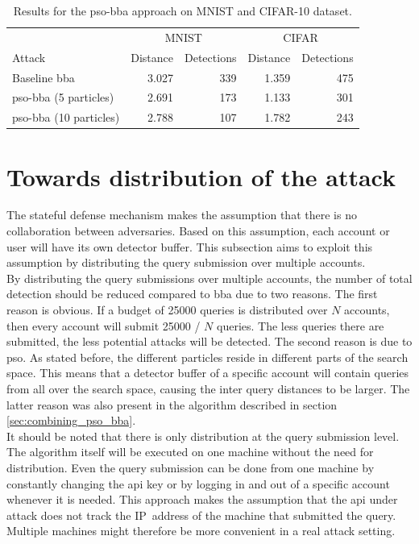 \begin{table}
	\centering
	\caption[PSO-BBA results]{Results for the \gls{pso}-\gls{bba} approach on MNIST and CIFAR-10 dataset.}
	\label{tbl:pso_bba}
	\begin{tabular}{lrrrr}\toprule
			& \multicolumn{2}{c}{MNIST} &\multicolumn{2}{c}{CIFAR} \\ \cmidrule(r){2-3} \cmidrule(r){4-5}
	Attack				&Distance	&Detections	&Distance	&Detections \\ \midrule
	Baseline \gls{bba}	&3.027		&339		&1.359			&475 \\
	\gls{pso}-\gls{bba} (5 particles)	&2.691			&173			&1.133				&301 \\ 
	\gls{pso}-\gls{bba} (10 particles)	&2.788			&107			&1.782				&243 \\
	
	\bottomrule
	
	\end{tabular}
\end{table}

\section{Towards distribution of the attack}
The stateful defense mechanism \cite{chen_stateful_2019} makes the assumption that there is no collaboration between adversaries. Based on this assumption, each account or user will have its own detector buffer. This subsection aims to exploit this assumption by distributing the query submission over multiple accounts.\\

By distributing the query submissions over multiple accounts, the number of total detection should be reduced compared to \gls{bba} due to two reasons. The first reason is obvious. If a budget of \num{25000} queries is distributed over $N$ accounts, then every account will submit \num{25000} / $N$ queries. The less queries there are submitted, the less potential attacks will be detected. The second reason is due to \gls{pso}. As stated before, the different particles reside in different parts of the search space. This means that a detector buffer of a specific account will contain queries from all over the search space, causing the inter query distances to be larger. The latter reason was also present in the algorithm described in section \ref{sec:combining_pso_bba}.\\

It should be noted that there is only distribution at the query submission level. The algorithm itself will be executed on one machine without the need for distribution. Even the query submission can be done from one machine by constantly changing the \gls{api} key or by logging in and out of a specific account whenever it is needed. This approach makes the assumption that the \gls{api} under attack does not track the IP~address of the machine that submitted the query. Multiple machines might therefore be more convenient in a real attack setting.\\

